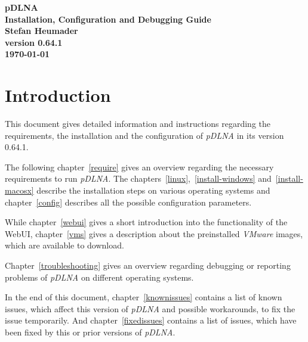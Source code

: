 \documentclass[a4paper,oneside,10pt]{report}
\newcommand{\pDLNAversion}{0.64.1}
\begin{document}
\pagestyle{empty}

\thispagestyle{empty}
\begin{center}
\Huge{\textbf{pDLNA}}\\
\vspace{0.5cm}
\Large{\textbf{Installation, Configuration and Debugging Guide}}\\
\vspace{2cm}
\large{\textbf{Stefan Heumader}}\\
\vspace{1cm}
\large{\textbf{version \pDLNAversion}}\\
\vspace{0.5cm}
\large{\textbf{\today}}\\
\end{center}

\tableofcontents
\cleardoublepage

\pagestyle{headings}

%
%

\chapter{Introduction}

This document gives detailed information and instructions regarding the requirements, the installation and the configuration of {\em pDLNA} in its version \pDLNAversion.

The following chapter~\ref{require} gives an overview regarding the necessary requirements to run {\em pDLNA}. The chapters~\ref{linux},~\ref{install-windows} and~\ref{install-macosx} describe the installation steps on various operating systems and chapter~\ref{config} describes all the possible configuration parameters.

While chapter~\ref{webui} gives a short introduction into the functionality of the WebUI, chapter~\ref{vms} gives a description about the preinstalled {\em VMware} images, which are available to download.

Chapter~\ref{troubleshooting} gives an overview regarding debugging or reporting problems of {\em pDLNA} on different operating systems.

In the end of this document, chapter~\ref{knownissues} contains a list of known issues, which affect this version of {\em pDLNA} and possible workarounds, to fix the issue temporarily. And chapter~\ref{fixedissues} contains a list of issues, which have been fixed by this or prior versions of {\em pDLNA}.
\end{document}

